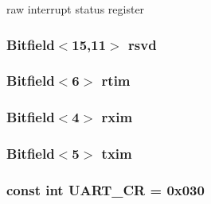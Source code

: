 \label{classPl011_ae2da020b580eb106d7e66a6b058a9e6d}
raw interrupt status register \hypertarget{classPl011_a996c37eb2080c15ad39204ff8bb4c6dd}{
\subsubsection[{rsvd}]{\setlength{\rightskip}{0pt plus 5cm}Bitfield$<$15,11$>$ {\bf rsvd}}}
\label{classPl011_a996c37eb2080c15ad39204ff8bb4c6dd}
\hypertarget{classPl011_a1f3d61050228be20dfe8ed8b9b94090d}{
\subsubsection[{rtim}]{\setlength{\rightskip}{0pt plus 5cm}Bitfield$<$6$>$ {\bf rtim}}}
\label{classPl011_a1f3d61050228be20dfe8ed8b9b94090d}
\hypertarget{classPl011_a38bbcf2758baf4ae6295a663465f65ce}{
\subsubsection[{rxim}]{\setlength{\rightskip}{0pt plus 5cm}Bitfield$<$4$>$ {\bf rxim}}}
\label{classPl011_a38bbcf2758baf4ae6295a663465f65ce}
\hypertarget{classPl011_a36c89652928b36336c1a9d4957e2813b}{
\subsubsection[{txim}]{\setlength{\rightskip}{0pt plus 5cm}Bitfield$<$5$>$ {\bf txim}}}
\label{classPl011_a36c89652928b36336c1a9d4957e2813b}
\hypertarget{classPl011_a6d01092295215e1cb41f34d2ed083816}{
\subsubsection[{UART\_\-CR}]{\setlength{\rightskip}{0pt plus 5cm}const int {\bf UART\_\-CR} = 0x030}}
